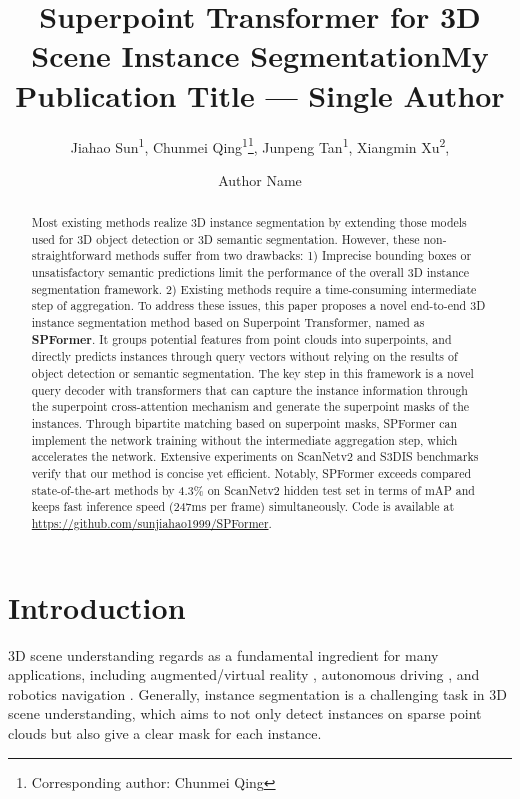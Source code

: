 \documentclass[letterpaper]{article} \usepackage{aaai23}  \usepackage{times}  \usepackage{helvet}  \usepackage{courier}  \usepackage[hyphens]{url}  \usepackage{graphicx} \urlstyle{rm} \def\UrlFont{\rm}  \usepackage{natbib}  \usepackage{caption} \frenchspacing  \setlength{\pdfpagewidth}{8.5in}  \setlength{\pdfpageheight}{11in}  \usepackage{algorithm}
\title{Superpoint Transformer for 3D Scene Instance Segmentation}
\author{
Jiahao Sun\textsuperscript{\rm 1}, 
    Chunmei Qing\textsuperscript{\rm 1}\thanks{Corresponding author: Chunmei Qing}, 
    Junpeng Tan\textsuperscript{\rm 1}, 
    Xiangmin Xu\textsuperscript{\rm 2},
}
\title{My Publication Title --- Single Author}
\author {
    Author Name
}
\begin{document}
\maketitle

\begin{abstract}
Most existing methods realize 3D instance segmentation by extending those models used for 3D object detection or 3D semantic segmentation. However, these non-straightforward methods suffer from two drawbacks: 1) Imprecise bounding boxes or unsatisfactory semantic predictions limit the performance of the overall 3D instance segmentation framework. 2) Existing methods require a time-consuming intermediate step of aggregation. To address these issues, this paper proposes a novel end-to-end 3D instance segmentation method based on Superpoint Transformer, named as \textbf{SPFormer}. It groups potential features from point clouds into superpoints, and directly predicts instances through query vectors without relying on the results of object detection or semantic segmentation. The key step in this framework is a novel query decoder with transformers that can capture the instance information through the superpoint cross-attention mechanism and generate the superpoint masks of the instances. Through bipartite matching based on superpoint masks, SPFormer can implement the network training without the intermediate aggregation step, which accelerates the network. Extensive experiments on ScanNetv2 and S3DIS benchmarks verify that our method is concise yet efficient. Notably, SPFormer exceeds compared state-of-the-art methods by 4.3\% on ScanNetv2 hidden test set in terms of mAP and keeps fast inference speed (247ms per frame) simultaneously. Code is available at \url{https://github.com/sunjiahao1999/SPFormer}.
\end{abstract}

\section{Introduction}
\label{sec:intro}
3D scene understanding regards as a fundamental ingredient for many applications, including augmented/virtual reality \cite{ar}, autonomous driving \cite{ad}, and robotics navigation \cite{rn}. Generally, instance segmentation is a challenging task in 3D scene understanding, which aims to not only detect instances on sparse point clouds but also give a clear mask for each instance.
\end{document}

